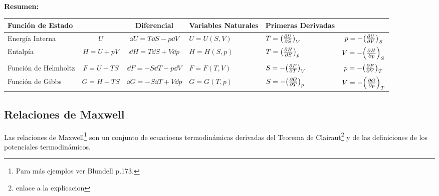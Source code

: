 \pagebreak

{\Large \textbf{Resumen:}} \\

\begin{table}[H]
	\centering
	\begin{tabular}{p{1.5cm}ccp{2.5cm}p{2.5cm}c}
		\hline
		Función de Estado &  & Diferencial & Variables Naturales & Primeras Derivadas & \\
		\hline
		Energía Interna & $U$ & $\dd{U} = T\dd{S} - p\dd{V}$ & $U = U(S,V)$ & $T = \qty(\pdv{U}{S})_V$ & $p = -\qty(\pdv{U}{V})_S$ \\
		Entalpía & $H = U + pV$ & $\dd{H} = T\dd{S} + V\dd{p}$ & $H = H(S,p)$ & $T = \qty(\pdv{H}{S})_p$ & $V = -\qty(\pdv{H}{p})_S$ \\
		Función de Helmholtz & $F = U - TS$ & $\dd{F} = -S\dd{T} - p\dd{V}$ & $F = F(T,V)$ & $S = -\qty(\pdv{F}{T})_V$ & $p = -\qty(\pdv{F}{V})_T$ \\
		Función de Gibbs & $G = H - TS$ & $\dd{G} = -S\dd{T} + V\dd{p}$ & $G = G(T,p)$ & $S = -\qty(\pdv{G}{T})_p$ & $V = -\qty(\pdv{G}{p})_T$ \\
		\hline
	\end{tabular}
\end{table}


\subsection{Relaciones de Maxwell}
Las relaciones de Maxwell\footnote{Para más ejemplos ver Blundell p.173.} son un conjunto de ecuacioens termodinámicas derivadas del Teorema de Clairaut\footnote{enlace a la explicacion} y de las definiciones de los potenciales termodinámicos.

